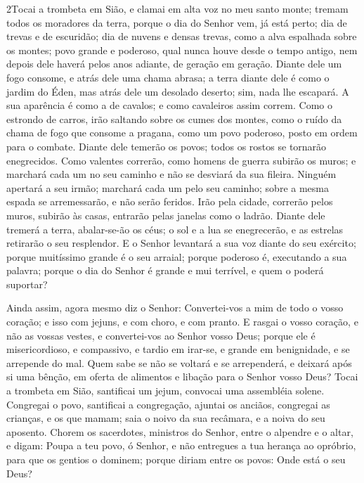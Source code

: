 \medskip

\lettrine{2} Tocai a trombeta em Sião, e clamai em alta voz no
meu santo monte; tremam todos os moradores da terra, porque o dia do
Senhor vem, já está perto; dia de trevas e de escuridão; dia de
nuvens e densas trevas, como a alva espalhada sobre os montes; povo
grande e poderoso, qual nunca houve desde o tempo antigo, nem depois
dele haverá pelos anos adiante, de geração em geração. Diante
dele um fogo consome, e atrás dele uma chama abrasa; a terra diante
dele é como o jardim do Éden, mas atrás dele um desolado deserto;
sim, nada lhe escapará. A sua aparência é como a de cavalos; e
como cavaleiros assim correm. Como o estrondo de carros, irão
saltando sobre os cumes dos montes, como o ruído da chama de fogo
que consome a pragana, como um povo poderoso, posto em ordem para o
combate. Diante dele temerão os povos; todos os rostos se
tornarão enegrecidos. Como valentes correrão, como homens de
guerra subirão os muros; e marchará cada um no seu caminho e não se
desviará da sua fileira. Ninguém apertará a seu irmão; marchará
cada um pelo seu caminho; sobre a mesma espada se arremessarão, e
não serão feridos. Irão pela cidade, correrão pelos muros,
subirão às casas, entrarão pelas janelas como o ladrão.
Diante dele tremerá a terra, abalar-se-ão os céus; o sol e a
lua se enegrecerão, e as estrelas retirarão o seu resplendor.
E o Senhor levantará a sua voz diante do seu exército; porque
muitíssimo grande é o seu arraial; porque poderoso é, executando a
sua palavra; porque o dia do Senhor é grande e mui terrível, e quem
o poderá suportar?

Ainda assim, agora mesmo diz o Senhor: Convertei-vos a mim de
todo o vosso coração; e isso com jejuns, e com choro, e com pranto.
E rasgai o vosso coração, e não as vossas vestes, e
convertei-vos ao Senhor vosso Deus; porque ele é misericordioso, e
compassivo, e tardio em irar-se, e grande em benignidade, e se
arrepende do mal. Quem sabe se não se voltará e se
arrependerá, e deixará após si uma bênção, em oferta de alimentos e
libação para o Senhor vosso Deus? Tocai a trombeta em Sião,
santificai um jejum, convocai uma assembléia solene.
Congregai o povo, santificai a congregação, ajuntai os
anciãos, congregai as crianças, e os que mamam; saia o noivo da sua
recâmara, e a noiva do seu aposento. Chorem os sacerdotes,
ministros do Senhor, entre o alpendre e o altar, e digam: Poupa a
teu povo, ó Senhor, e não entregues a tua herança ao opróbrio, para
que os gentios o dominem; porque diriam entre os povos: Onde está o
seu Deus?

